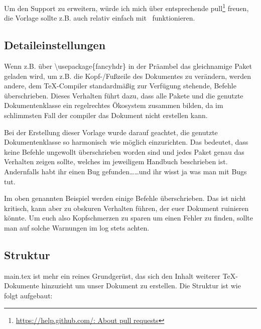Um den Support zu erweitern, würde ich mich über entsprechende \gls{pull}\footnote{\href{https://help.github.com/en/articles/about-pull-requests}{https://help.github.com/: About pull requests}} freuen, die Vorlage sollte z.B. auch relativ einfach mit \ funktionieren.

\subsection{Detaileinstellungen}
\label{detail-grundl}
Wenn z.B. über \textbackslash usepackage\{fancyhdr\} in der Präambel das gleichnamige Paket geladen wird, um z.B. die Kopf-/Fußzeile des Dokumentes zu verändern, werden andere, dem \TeX{}-Compiler standardmäßig zur Verfügung stehende, Befehle überschrieben. Dieses Verhalten führt dazu, dass alle Pakete und die genutzte Dokumentenklasse ein regelrechtes Ökosystem zusammen bilden, da im schlimmsten Fall der \gls{compiler} das Dokument nicht erstellen kann.

Bei der Erstellung dieser Vorlage wurde darauf geachtet, die genutzte Dokumentenklasse so \glqq harmonisch\grqq\ wie möglich einzurichten. Das bedeutet, dass keine Befehle ungewollt überschrieben worden sind und jedes Paket genau das Verhalten zeigen sollte, welches im jeweiligem Handbuch beschrieben ist. Andernfalls habt ihr einen Bug gefunden\dots \dots und ihr wisst ja was man mit Bugs tut.

Im oben genannten Beispiel werden einige Befehle überschrieben. Das ist nicht kritisch, kann aber zu obskuren Verhalten führen, der euer Dokument ruinieren könnte. Um euch also Kopfschmerzen zu sparen um einen Fehler zu finden, sollte man auf solche Warnungen im log stets achten.

\subsection{Struktur}
main.tex ist mehr ein reines Grundgerüst, das sich den Inhalt weiterer \TeX{}-Dokumente hinzuzieht um unser Dokument zu erstellen. Die Struktur ist wie folgt aufgebaut:

